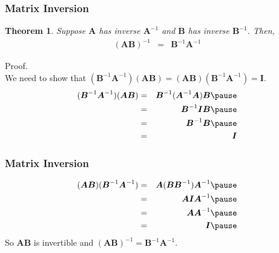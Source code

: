\documentclass[handout]{beamer}
\newtheorem{thm}{Theorem}
\numberwithin{equation}{section}
\begin{document}
\begin{frame}
\frametitle{Matrix Inversion}

\begin{thm} Suppose $\boldsymbol{A}$ has inverse $\boldsymbol{A}^{-1}$ and $\boldsymbol{B}$ has inverse $\boldsymbol{B}^{-1}$.  Then, 
\begin{eqnarray}
(\boldsymbol{A} \boldsymbol{B})^{-1} & = & \boldsymbol{B}^{-1} \boldsymbol{A}^{-1} \nonumber 
\end{eqnarray}
\end{thm}

\pause 


Proof.\\
We need to show that $(\boldsymbol{B}^{-1} \boldsymbol{A}^{-1} ) (\boldsymbol{A} \boldsymbol{B}) = (\boldsymbol{A} \boldsymbol{B})(\boldsymbol{B}^{-1} \boldsymbol{A}^{-1}) = \boldsymbol{I}$. \pause  
\begin{eqnarray}
(\boldsymbol{B}^{-1} \boldsymbol{A}^{-1} ) (\boldsymbol{A} \boldsymbol{B})  &  = & \boldsymbol{B}^{-1} (\boldsymbol{A}^{-1}  \boldsymbol{A}) \boldsymbol{B} \nonumber \pause \\
& = & \boldsymbol{B}^{-1} \boldsymbol{I} \boldsymbol{B} \nonumber \pause \\
& = & \boldsymbol{B}^{-1} \boldsymbol{B}\nonumber \pause \\
& = & \boldsymbol{I}\nonumber 
\end{eqnarray}

\end{frame}

\begin{frame}
\frametitle{Matrix Inversion}

\begin{eqnarray}
(\boldsymbol{A} \boldsymbol{B})(\boldsymbol{B}^{-1} \boldsymbol{A}^{-1}) & = & \boldsymbol{A} (\boldsymbol{B}\boldsymbol{B}^{-1})  \boldsymbol{A}^{-1} \nonumber \pause \\
& = & \boldsymbol{A} \boldsymbol{I} \boldsymbol{A}^{-1} \nonumber \pause \\
& = & \boldsymbol{A} \boldsymbol{A}^{-1} \nonumber \pause \\
& = & \boldsymbol{I} \nonumber \pause
\end{eqnarray}
So $\boldsymbol{A}\boldsymbol{B} $ is invertible and $(\boldsymbol{A}\boldsymbol{B} )^{-1}   = \boldsymbol{B}^{-1} \boldsymbol{A}^{-1} $.

\end{frame}
\end{document}
